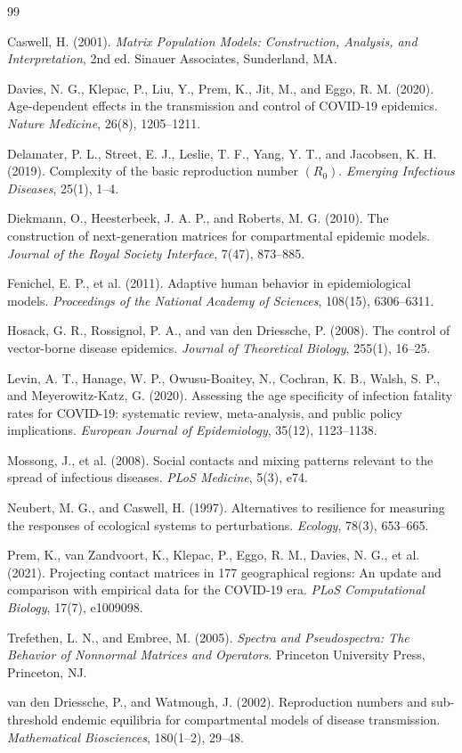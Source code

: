 \documentclass[12pt]{article}
\begin{document}
\begin{thebibliography}{99}

 Caswell, H. (2001). \emph{Matrix Population Models: Construction, Analysis, and Interpretation}, 2nd ed. Sinauer Associates, Sunderland, MA.

 Davies, N. G., Klepac, P., Liu, Y., Prem, K., Jit, M., and Eggo, R. M. (2020). Age-dependent effects in the transmission and control of COVID-19 epidemics. \emph{Nature Medicine}, 26(8), 1205--1211.

 Delamater, P. L., Street, E. J., Leslie, T. F., Yang, Y. T., and Jacobsen, K. H. (2019). Complexity of the basic reproduction number $(R_0)$. \emph{Emerging Infectious Diseases}, 25(1), 1--4.

 Diekmann, O., Heesterbeek, J. A. P., and Roberts, M. G. (2010). The construction of next-generation matrices for compartmental epidemic models. \emph{Journal of the Royal Society Interface}, 7(47), 873--885.

 Fenichel, E. P., et al. (2011). Adaptive human behavior in epidemiological models. \emph{Proceedings of the National Academy of Sciences}, 108(15), 6306--6311.

 Hosack, G. R., Rossignol, P. A., and van den Driessche, P. (2008). The control of vector-borne disease epidemics. \emph{Journal of Theoretical Biology}, 255(1), 16--25.

 Levin, A. T., Hanage, W. P., Owusu-Boaitey, N., Cochran, K. B., Walsh, S. P., and Meyerowitz-Katz, G. (2020). Assessing the age specificity of infection fatality rates for COVID-19: systematic review, meta-analysis, and public policy implications. \emph{European Journal of Epidemiology}, 35(12), 1123--1138.

 Mossong, J., et al. (2008). Social contacts and mixing patterns relevant to the spread of infectious diseases. \emph{PLoS Medicine}, 5(3), e74.

 Neubert, M. G., and Caswell, H. (1997).
Alternatives to resilience for measuring the responses of ecological systems to perturbations. \emph{Ecology}, 78(3), 653--665.

 Prem, K., van Zandvoort, K., Klepac, P., Eggo, R. M., Davies, N. G., et al. (2021). Projecting contact matrices in 177 geographical regions: An update and comparison
with empirical data for the COVID-19 era. \emph{PLoS Computational Biology}, 17(7), e1009098.

 Trefethen, L. N., and Embree, M. (2005). \emph{Spectra and Pseudospectra: The Behavior of Nonnormal Matrices and Operators}. Princeton University Press, Princeton, NJ.

 van den Driessche, P., and Watmough, J. (2002). Reproduction numbers and sub-threshold endemic equilibria for compartmental models of disease transmission. \emph{Mathematical Biosciences}, 180(1--2), 29--48.

\end{thebibliography}
\end{document}
